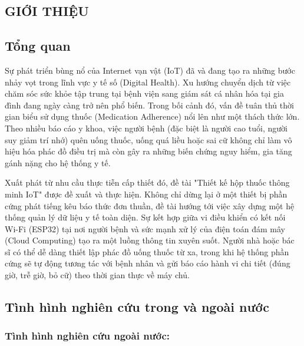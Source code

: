 \documentclass[12pt, a4paper, oneside]{article}
\begin{document}
\newpage
\thispagestyle{empty}
\renewcommand{\contentsname}{\centering {MỤC LỤC}}
\tableofcontents



\newpage
\setcounter{page}{1}

\begin{center}
    \section{GIỚI THIỆU}
\end{center}
\subsection{Tổng quan}
Sự phát triển bùng nổ của Internet vạn vật (IoT) đã và đang tạo ra những bước nhảy vọt trong lĩnh vực y tế số (Digital Health). Xu hướng chuyển dịch từ việc chăm sóc sức khỏe tập trung tại bệnh viện sang giám sát cá nhân hóa tại gia đình đang ngày càng trở nên phổ biến. Trong bối cảnh đó, vấn đề tuân thủ thời gian biểu sử dụng thuốc (Medication Adherence) nổi lên như một thách thức lớn. Theo nhiều báo cáo y khoa, việc người bệnh (đặc biệt là người cao tuổi, người suy giảm trí nhớ) quên uống thuốc, uống quá liều hoặc sai cữ không chỉ làm vô hiệu hóa phác đồ điều trị mà còn gây ra những biến chứng nguy hiểm, gia tăng gánh nặng cho hệ thống y tế.

Xuất phát từ nhu cầu thực tiễn cấp thiết đó, đề tài "Thiết kế hộp thuốc thông minh IoT" được đề xuất và thực hiện. Không chỉ dừng lại ở một thiết bị phần cứng phát tiếng kêu báo thức đơn thuần, đề tài hướng tới việc xây dựng một hệ thống quản lý dữ liệu y tế toàn diện. Sự kết hợp giữa vi điều khiển có kết nối Wi-Fi (ESP32) tại nơi người bệnh và sức mạnh xử lý của điện toán đám mây (Cloud Computing) tạo ra một luồng thông tin xuyên suốt. Người nhà hoặc bác sĩ có thể dễ dàng thiết lập phác đồ uống thuốc từ xa, trong khi hệ thống phần cứng sẽ tự động tương tác với bệnh nhân và gửi báo cáo hành vi chi tiết (đúng giờ, trễ giờ, bỏ cữ) theo thời gian thực về máy chủ.

\subsection{Tình hình nghiên cứu trong và ngoài nước}
\subsubsection{Tình hình nghiên cứu ngoài nước:} 
\end{document}
